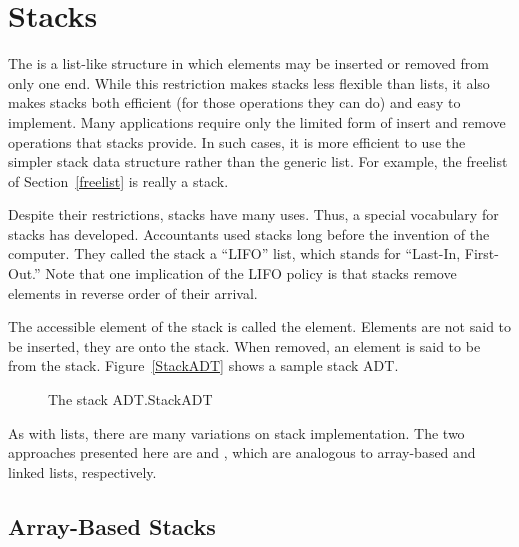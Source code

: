 \section{Stacks}
\label{Stacks}

The  is a list-like structure
in which elements may be inserted or removed from only one end.
While this restriction makes stacks less flexible than lists,
it also makes stacks both efficient (for those operations they can do)
and easy to implement.
Many applications require only the limited form of
insert and remove operations
that stacks provide.
In such cases, it is more efficient to use the simpler stack data
structure rather than the generic list.
For example, the freelist of Section~\ref{freelist} is really a
stack.

Despite their restrictions, stacks have many uses.
Thus, a special vocabulary for stacks has developed.
Accountants used stacks long before the invention
of the computer.
They called the stack a ``LIFO'' list,
which stands for ``Last-In, First-Out.'' 
Note that one implication of the LIFO policy is that stacks
remove elements in reverse order of their arrival.

The accessible element of the stack is called
the  element.
Elements are not said to be inserted, they are
 onto the stack.
When removed, an element is said to be
 from the stack.
Figure~\ref{StackADT} shows a sample stack ADT.

\begin{figure}
\vspace{-\bigskipamount}
{The stack ADT.}{StackADT}
\vspace{-\smallskipamount}
\end{figure}

As with lists, there are many variations on stack implementation.
The two approaches presented here are  and
, 
which are analogous to array-based and linked lists, respectively.

\subsection{Array-Based Stacks}

